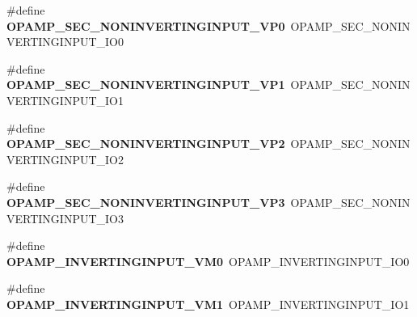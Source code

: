 \begin{DoxyCompactItemize}
\#define {\bfseries O\+P\+A\+M\+P\+\_\+\+S\+E\+C\+\_\+\+N\+O\+N\+I\+N\+V\+E\+R\+T\+I\+N\+G\+I\+N\+P\+U\+T\+\_\+\+V\+P0}~O\+P\+A\+M\+P\+\_\+\+S\+E\+C\+\_\+\+N\+O\+N\+I\+N\+V\+E\+R\+T\+I\+N\+G\+I\+N\+P\+U\+T\+\_\+\+I\+O0
\item 
\mbox{\label{group___h_a_l___o_p_a_m_p___aliased___defines_ga044a5996a702fe67bd404674d6ce2890}} 
\#define {\bfseries O\+P\+A\+M\+P\+\_\+\+S\+E\+C\+\_\+\+N\+O\+N\+I\+N\+V\+E\+R\+T\+I\+N\+G\+I\+N\+P\+U\+T\+\_\+\+V\+P1}~O\+P\+A\+M\+P\+\_\+\+S\+E\+C\+\_\+\+N\+O\+N\+I\+N\+V\+E\+R\+T\+I\+N\+G\+I\+N\+P\+U\+T\+\_\+\+I\+O1
\item 
\mbox{\label{group___h_a_l___o_p_a_m_p___aliased___defines_ga99d279a0ad7e685d456f454d4eb90c02}} 
\#define {\bfseries O\+P\+A\+M\+P\+\_\+\+S\+E\+C\+\_\+\+N\+O\+N\+I\+N\+V\+E\+R\+T\+I\+N\+G\+I\+N\+P\+U\+T\+\_\+\+V\+P2}~O\+P\+A\+M\+P\+\_\+\+S\+E\+C\+\_\+\+N\+O\+N\+I\+N\+V\+E\+R\+T\+I\+N\+G\+I\+N\+P\+U\+T\+\_\+\+I\+O2
\item 
\mbox{\label{group___h_a_l___o_p_a_m_p___aliased___defines_gac8152b9a1e42f8513a907918f2db651b}} 
\#define {\bfseries O\+P\+A\+M\+P\+\_\+\+S\+E\+C\+\_\+\+N\+O\+N\+I\+N\+V\+E\+R\+T\+I\+N\+G\+I\+N\+P\+U\+T\+\_\+\+V\+P3}~O\+P\+A\+M\+P\+\_\+\+S\+E\+C\+\_\+\+N\+O\+N\+I\+N\+V\+E\+R\+T\+I\+N\+G\+I\+N\+P\+U\+T\+\_\+\+I\+O3
\item 
\mbox{\label{group___h_a_l___o_p_a_m_p___aliased___defines_gaa6ab36e92c4c9e5f08a766d722cc12e2}} 
\#define {\bfseries O\+P\+A\+M\+P\+\_\+\+I\+N\+V\+E\+R\+T\+I\+N\+G\+I\+N\+P\+U\+T\+\_\+\+V\+M0}~O\+P\+A\+M\+P\+\_\+\+I\+N\+V\+E\+R\+T\+I\+N\+G\+I\+N\+P\+U\+T\+\_\+\+I\+O0
\item 
\mbox{\label{group___h_a_l___o_p_a_m_p___aliased___defines_ga1d73eb5e8d6e1c4e22cbdd896586375a}} 
\#define {\bfseries O\+P\+A\+M\+P\+\_\+\+I\+N\+V\+E\+R\+T\+I\+N\+G\+I\+N\+P\+U\+T\+\_\+\+V\+M1}~O\+P\+A\+M\+P\+\_\+\+I\+N\+V\+E\+R\+T\+I\+N\+G\+I\+N\+P\+U\+T\+\_\+\+I\+O1
\item 
\mbox{\label{group___h_a_l___o_p_a_m_p___aliased___defines_ga16004eef1f4113ba471e24cd51570a78}} 

\end{DoxyCompactItemize}
